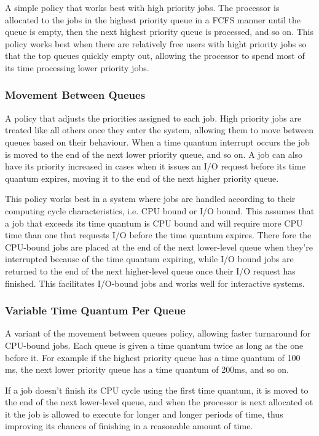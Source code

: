 \documentclass[12pt letter]{report}
\begin{document}
A simple policy that works best with high priority jobs. The
processor is allocated to the jobs in the highest priority queue in a
FCFS manner until the queue is empty, then the next highest priority
queue is processed, and so on. This policy works best when there are
relatively free users with hight priority jobs so that the top queues
quickly empty out, allowing the processor to spend most of its time
processing lower priority jobs.

\subsubsection{Movement Between Queues}

A policy that adjusts the priorities assigned to each job. High
priority jobs are treated like all others once they enter the system,
allowing them to move between queues based on their behaviour. When a
time quantum interrupt occurs the job is moved to the end of the next
lower priority queue, and so on. A job can also have its priority
increased in cases when it issues an I/O request before its time
quantum expires, moving it to the end of the next higher priority queue.

This policy works best in a system where jobs are handled according
to  their computing cycle characteristics, i.e. CPU bound or I/O
bound. This assumes that a job that exceeds its time quantum is CPU
bound and will require more CPU time than one that requests I/O
before the time quantum expires. There fore the CPU-bound jobs are
placed at the end of the next lower-level queue when they're
interrupted because of the time quantum expiring, while I/O bound
jobs are returned to the end of the next higher-level queue once
their I/O request has finished. This facilitates I/O-bound jobs and
works well for interactive systems.

\subsubsection{Variable Time Quantum Per Queue}

A variant of the movement between queues policy, allowing faster
turnaround for CPU-bound jobs. Each queue is given a time quantum
twice as long as the one before it. For example if the highest
priority queue has a time quantum of 100 ms, the next lower priority
queue has a time quantum of 200ms, and so on.

If a job doesn't finish its CPU cycle using the first time quantum,
it is moved to the end of the next lower-level queue, and when the
processor is next allocated ot it the job is allowed to execute for
longer and longer periods of time, thus improving its chances of
finishing in a reasonable amount of time.
\end{document}
